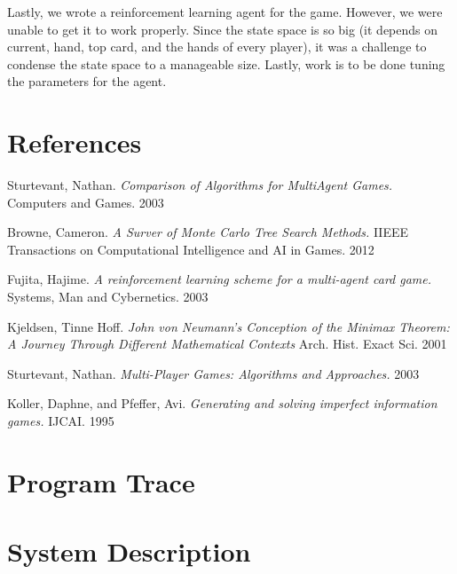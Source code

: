 \documentclass[11pt]{article}
\begin{document}
Lastly, we wrote a reinforcement learning agent for the game. However, we were unable to get it to work properly. Since the state space is so big (it depends on current, hand, top card, and the hands of every player), it was a challenge to condense the state space to a manageable size. Lastly, work is to be done tuning the parameters for the agent.

\section{References}

\begin{thebibliography}{5}

	Sturtevant, Nathan.
	\emph{Comparison of Algorithms for MultiAgent Games.}
	Computers and Games.
	2003

	Browne, Cameron.
	\emph{A Surver of Monte Carlo Tree Search Methods.}
	IIEEE Transactions on Computational Intelligence and AI in Games. 
	2012

	Fujita, Hajime.
	\emph{A reinforcement learning scheme for a multi-agent card game.}
	Systems, Man and Cybernetics.
	2003

	Kjeldsen, Tinne Hoff.
	\emph{John von Neumann’s Conception of the Minimax Theorem: A Journey Through Different Mathematical Contexts}
	Arch. Hist. Exact Sci.
	2001
	
	Sturtevant, Nathan.
	\emph{Multi-Player Games: Algorithms and Approaches.}
	2003
	
	Koller, Daphne, and Pfeffer, Avi.
	\emph{Generating and solving imperfect information games.}
	IJCAI.
	1995
	
\end{thebibliography}

\appendix

\section{Program Trace}



\section{System Description}
\end{document}
